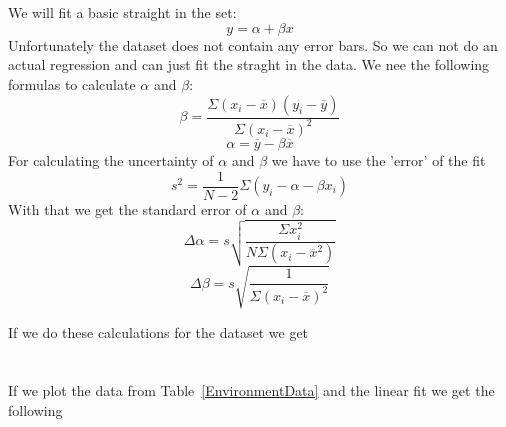 \documentclass[11pt]{article}
\begin{document}
    \section{}
    We will fit a basic straight in the set:
    \begin{equation}
        y = \alpha + \beta x
    \end{equation}
    Unfortunately the dataset does not contain any error bars.
    So we can not do an actual regression and can just fit the straght in the data.
    We nee the following formulas to calculate $\alpha$ and $\beta$:
    \begin{equation}
        \beta = \frac{\Sigma (x_i - \overline{x}) (y_i - \overline{y})}{\Sigma (x_i - \overline{x})^2} 
    \end{equation}
    \begin{equation}
        \alpha = \overline{y} - \beta \overline{x}
    \end{equation}
    For calculating the uncertainty of $\alpha$ and $\beta$ we have to use the 'error' of the fit
    \begin{equation}
        s^2 = \frac{1}{N-2}\Sigma (y_i - \alpha - \beta x_i)
    \end{equation}
    With that we get the standard error of $\alpha$ and $\beta$:
    \begin{equation}
        \Delta\alpha = s \sqrt { \frac{\Sigma x_i^2}{N \Sigma (x_i - \overline{x}^2)}}
    \end{equation}
    \begin{equation}
        \Delta\beta = s \sqrt {\frac{1}{\Sigma (x_i - \overline{x})^2}}
    \end{equation}

    If we do these calculations for the dataset we get
    
    

    \section{}
    If we plot the data from Table~\ref{EnvironmentData} and the linear fit we get the following
    
\end{document}

